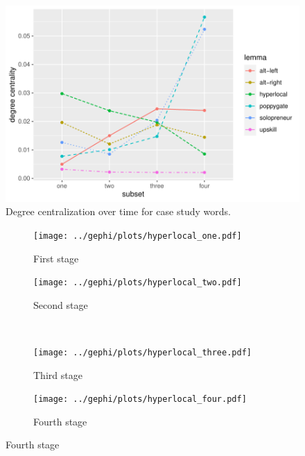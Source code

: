 \documentclass[
  a4paper,
  abstract=on,
  captions=tableabove
  ]{scrartcl}
\begin{document}
      \begin{figure}[H]
        \caption{Degree centralization over time for case study words.}
        \centering
        \includegraphics[width=\linewidth, height=.8\textheight, keepaspectratio]{img/cases_cent_diac.pdf}
      \end{figure}


      \begin{figure}[H]
        \caption{Social network of diffusion for \emph{hyperlocal} over time.}
        \centering
        \begin{subfigure}{.45\linewidth}
          \caption{First stage}
          \centering
          \texttt{[image: ../gephi/plots/hyperlocal\_one.pdf]}
        \end{subfigure}
        \begin{subfigure}{.45\linewidth}
          \caption{Second stage}
          \centering
          \texttt{[image: ../gephi/plots/hyperlocal\_two.pdf]}
        \end{subfigure}\\
        \begin{subfigure}{.45\linewidth}
          \caption{Third stage}
          \centering
          \texttt{[image: ../gephi/plots/hyperlocal\_three.pdf]}
        \end{subfigure}
        \begin{subfigure}{.45\linewidth}
          \caption{Fourth stage}
          \centering
          \texttt{[image: ../gephi/plots/hyperlocal\_four.pdf]}
        \end{subfigure}
      \end{figure}
\end{document}

